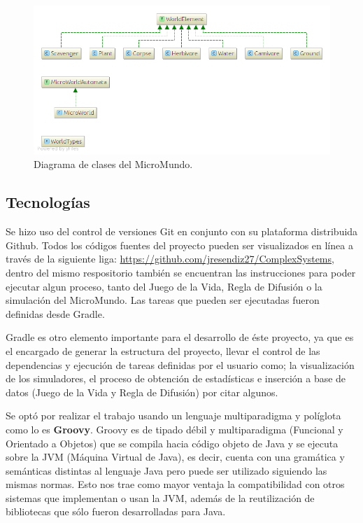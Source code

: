     \begin{figure}[h!]
      \centering
        \includegraphics[scale=0.6]{./images/classDiagram}
        \caption{Diagrama de clases del MicroMundo.} 
    \end{figure}
  \newpage
  \subsection{Tecnologías}
    Se hizo uso del control de versiones Git en conjunto con su plataforma distribuida Github. Todos los códigos fuentes del proyecto pueden ser visualizados en línea a través de la siguiente liga: \url{https://github.com/jresendiz27/ComplexSystems}, dentro del mismo respositorio también se encuentran las instrucciones para poder ejecutar algun proceso, tanto del Juego de la Vida, Regla de Difusión o la simulación del MicroMundo. Las tareas que pueden ser ejecutadas fueron definidas desde Gradle.

    Gradle es otro elemento importante para el desarrollo de éste proyecto, ya que es el encargado de generar la estructura del proyecto, llevar el control de las dependencias y ejecución de tareas definidas por el usuario como; la visualización de los simuladores, el proceso de obtención de estadísticas e inserción a base de datos (Juego de la Vida y Regla de Difusión) por citar algunos.

    Se optó por realizar el trabajo usando un lenguaje multiparadigma y políglota como lo es \textbf{Groovy}. Groovy es de tipado débil y multiparadigma (Funcional y Orientado a Objetos) que se compila hacia código objeto de Java y se ejecuta sobre la JVM (Máquina Virtual de Java), es decir, cuenta con una gramática y semánticas distintas al lenguaje Java pero puede ser utilizado siguiendo las mismas normas. Esto nos trae como mayor ventaja la compatibilidad con otros sistemas que implementan o usan la JVM, además de la reutilización de bibliotecas que sólo fueron desarrolladas para Java.

